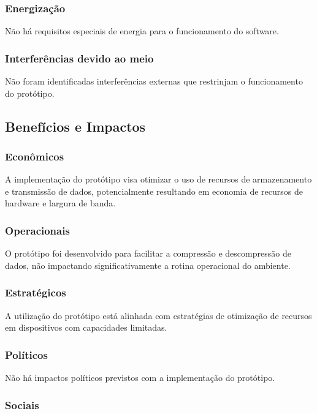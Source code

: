 \subsubsection{Energização}

Não há requisitos especiais de energia para o funcionamento do software.

\subsubsection{Interferências devido ao meio}

Não foram identificadas interferências externas que restrinjam o funcionamento do protótipo.

\subsection{Benefícios e Impactos}

\subsubsection{Econômicos}

A implementação do protótipo visa otimizar o uso de recursos de armazenamento e transmissão de dados, potencialmente resultando em economia de recursos de hardware e largura de banda.

\subsubsection{Operacionais}

O protótipo foi desenvolvido para facilitar a compressão e descompressão de dados, não impactando significativamente a rotina operacional do ambiente.

\subsubsection{Estratégicos}

A utilização do protótipo está alinhada com estratégias de otimização de recursos em dispositivos com capacidades limitadas.

\subsubsection{Políticos}

Não há impactos políticos previstos com a implementação do protótipo.

\subsubsection{Sociais}

